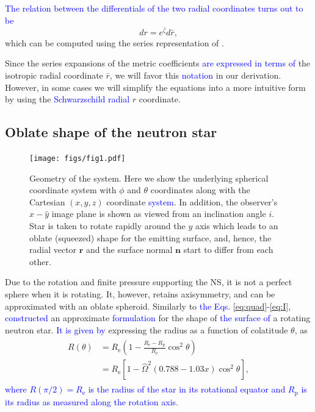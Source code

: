 \documentclass{aa}
\newcommand{\be}{\begin{equation}}
\newcommand{\ee}{\end{equation}}
\renewcommand{\vec}[1]{\ensuremath{\boldsymbol{#1}}}
\newcommand{\refe}[1]{\textcolor{blue}{{#1}}}
\newcommand{\refedel}[1]{}
\newcommand{\Req}{\ensuremath{R_{\mathrm{e}}}}
\newcommand{\sch}{Schwarzschild }
\newcommand{\rb}{\ensuremath{\bar{r}}}
\newcommand{\Ob}{\ensuremath{\hat{\Omega}}}
\newcommand{\zetab}{\ensuremath{\bar{\zeta}}}
\begin{document}
\refe{The relation between the differentials of the two radial coordinates turns out to be}
\be\label{eq:drb2dr}
dr = e^{\zetab} d\rb,
\ee
which can be computed using the series representation of \cite{BI76}.

Since the series expansions of the metric coefficients \refe{are expressed in terms of} the isotropic radial coordinate $\rb$, we will favor this \refe{notation} in our derivation.  
However, in some cases we will simplify the equations into a more intuitive form by using the \refe{\sch radial} $r$ coordinate.


\subsection{Oblate shape of the neutron star}\label{sect:oblate}

\begin{figure}
\centering
\texttt{[image: figs/fig1.pdf]}
\caption{\label{fig:geom}
Geometry of the system. Here we show the underlying spherical coordinate system with $\phi$ and $\theta$ coordinates along with the Cartesian $(x,y,z)$ coordinate \refe{system}.
In addition, the observer's $\hat{x}-\hat{y}$ image plane is shown as viewed from an inclination angle $i$.
Star is taken to rotate rapidly around the $y$ axis which leads to an oblate (squeezed) shape for the emitting surface, and, hence, the radial vector $\vec{r}$ and the surface normal $\vec{n}$ start to differ from each other.
}
\end{figure}

Due to the rotation and finite pressure supporting the NS, it is not a perfect sphere when it is rotating.  
It, however, retains axisymmetry, and can be approximated with an oblate spheroid.  
Similarly to \refe{the Eqs. \eqref{eq:quad}-\eqref{eq:I},} \citet{aGM14} \refedel{derived}\refe{constructed} an approximate \refe{formulation} for the shape of \refe{the surface of} a rotating neutron star. 
\refe{It is given by} expressing the radius as a function of colatitude $\theta$, as 
\begin{align}\begin{split}\label{eq:radf}
    R(\theta) &= \Req \left( 1 - \frac{\Req - R_{\mathrm{p}}}{\Req} \cos^2\theta \right) \\
              &= \Req [1-\Ob^2 (0.788 - 1.03x) \cos^2 \theta],
\end{split}\end{align}
\refe{where $R(\pi/2) = \Req$ is the radius of the star in its rotational equator and $R_{\mathrm{p}}$ is its radius as measured along the rotation axis.}
\end{document}
